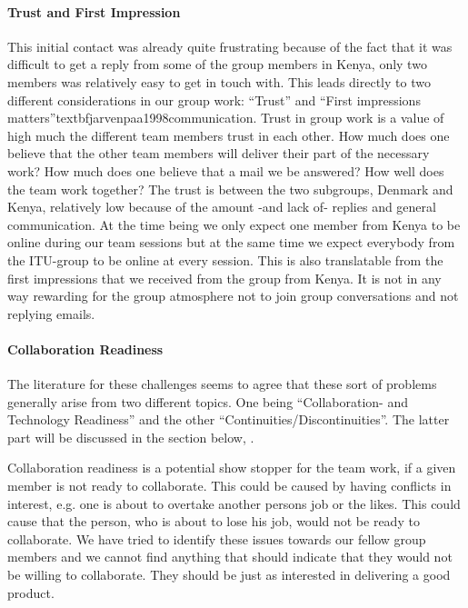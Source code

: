 \paragraph{Trust and First Impression} \label{par:trustandfirstimpressions}
This initial contact was already quite frustrating because of the fact that it was difficult to get a reply from some of the group members in Kenya, only two members was relatively easy to get in touch with. This leads directly to two different considerations in our group work: ``Trust'' \cite{jarvenpaa1998communication} and ``First impressions matters''textbf{jarvenpaa1998communication}. Trust in group work is a value of high much the different team members trust in each other. How much does one believe that the other team members will deliver their part of the necessary work? How much does one believe that a mail we be answered? How well does the team work together? The trust is between the two subgroups, Denmark and Kenya, relatively low because of the amount -and lack of- replies and general communication. At the time being we only expect one member from Kenya to be online during our team sessions but at the same time we expect everybody from the ITU-group to be online at every session. This is also translatable from the first impressions that we received from the group from Kenya. It is not in any way rewarding for the group atmosphere not to join group conversations and not replying emails. 

\paragraph{Collaboration Readiness} \label{par:collaborationreadiness}
The literature for these challenges seems to agree that these sort of problems generally arise from two different topics. One being ``Collaboration- and Technology Readiness'' and the other ``Continuities/Discontinuities''. The latter part will be discussed in the section below, .

Collaboration readiness is a potential show stopper for the team work, if a given member is not ready to collaborate. This could be caused by having conflicts in interest, e.g. one is about to overtake another persons job or the likes. This could cause that the person, who is about to lose his job, would not be ready to collaborate. We have tried to identify these issues towards our fellow group members and we cannot find anything that should indicate that they would not be willing to collaborate. They should be just as interested in delivering a good product. 


